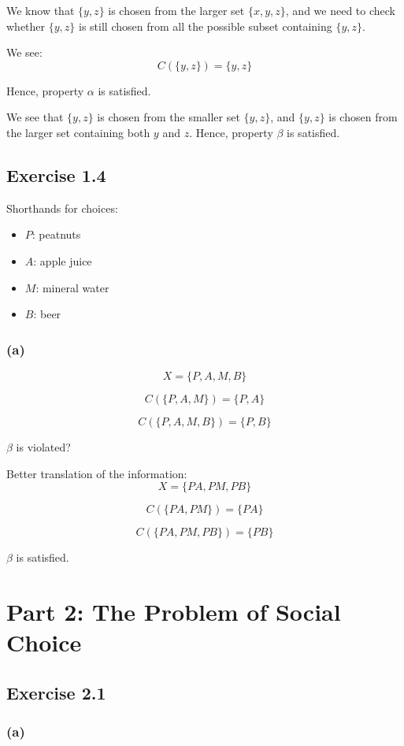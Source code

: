 \documentclass[a4paper]{article}
\begin{document}
We know that $\{y,z\}$ is chosen from the larger set $\{x,y,z\}$, and we need to check whether $\{y,z\}$ is still chosen from all the possible subset containing $\{y,z\}$.

We see:
\[C(\{y,z\})=\{y,z\} \]

Hence, property $\alpha$ is satisfied.

We see that $\{y,z\}$ is chosen from the smaller set $\{y,z\}$, and $\{y,z\}$ is chosen from the larger set containing both $y$ and $z$. Hence, property $\beta$ is satisfied.


\subsection*{Exercise 1.4}

Shorthands for choices:
\begin{itemize}
    \item $P$: peatnuts
    \item $A$: apple juice
    \item $M$: mineral water
    \item $B$: beer
\end{itemize}

\subsubsection*{(a)}

\[X=\{P,A,M,B \} \]

\[C(\{P,A,M\})=\{P, A\} \]

\[C(\{P,A,M,B\})=\{P, B\} \]

$\beta$ is violated?

Better translation of the information:
\[X=\{PA, PM, PB \} \]

\[C(\{PA,PM\})=\{PA\} \]

\[C(\{PA,PM,PB\})=\{PB\} \]

$\beta$ is satisfied.

\section*{Part 2: The Problem of Social Choice}

\subsection*{Exercise 2.1}

\subsubsection*{(a)}
\end{document}
